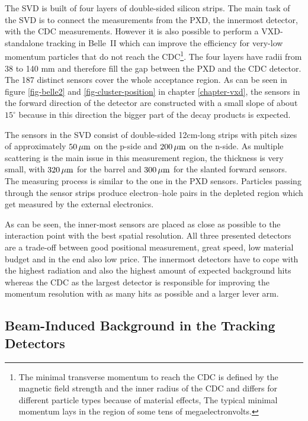 The SVD is built of four layers of double-sided silicon strips. The main task of the SVD is to connect the measurements from the PXD, the innermost detector, with the CDC measurements. However it is also possible to perform a VXD-standalone tracking in Belle~II which can improve the efficiency for very-low momentum particles that do not reach the CDC\footnote{The minimal transverse momentum to reach the CDC is defined by the magnetic field strength and the inner radius of the CDC and differs for different particle types because of material effects, The typical minimal momentum lays in the region of some tens of megaelectronvolts.}. The four layers have radii from 38 to 140 mm and therefore fill the gap between the PXD and the CDC detector. The 187 distinct sensors cover the whole acceptance region. As can be seen in figure \ref{fig-belle2} and \ref{fig-cluster-position} in chapter \ref{chapter-vxd}, the sensors in the forward direction of the detector are constructed with a small slope of about $15^\circ$ because in this direction the bigger part of the decay products is expected. 

The sensors in the SVD consist of double-sided 12cm-long strips with pitch sizes of approximately $\unit[50]{\mu m}$ on the p-side and $\unit[200]{\mu m}$ on the n-side. As multiple scattering is the main issue in this measurement region, the thickness is very small, with $\unit[320]{\mu m}$ for the barrel and $\unit[300]{\mu m}$ for the slanted forward sensors. The measuring process is similar to the one in the PXD sensors. Particles passing through the sensor strips produce electron--hole pairs in the depleted region which get measured by the external electronics. 

As can be seen, the inner-most sensors are placed as close as possible to the interaction point with the best spatial resolution. All three presented detectors are a trade-off between good positional measurement, great speed, low material budget and in the end also low price. The innermost detectors have to cope with the highest radiation and also the highest amount of expected background hits whereas the CDC as the largest detector is responsible for improving the momentum resolution with as many hits as possible and a larger lever arm.

\subsection{Beam-Induced Background in the Tracking Detectors}

